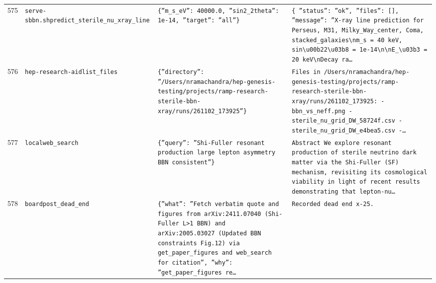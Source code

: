 \documentclass[11pt,a4paper]{article}
\begin{document}
\begin{longtable}{@{}p{}p{}p{}p{}@{}}
575 & \texttt{serve-sbbn.sh}\newline\texttt{predict\_\allowbreak{}sterile\_\allowbreak{}nu\_\allowbreak{}xray\_\allowbreak{}line} & \texttt{\{''m\_\allowbreak{}s\_\allowbreak{}eV'':\allowbreak{} 40000.0,\allowbreak{} ''sin2\_\allowbreak{}2theta'':\allowbreak{} 1e-14,\allowbreak{} ''target'':\allowbreak{} ''all''\}\allowbreak{}} & \texttt{\{   ''status'':\allowbreak{} ''ok'',\allowbreak{}   ''files'':\allowbreak{} []\allowbreak{},\allowbreak{}   ''message'':\allowbreak{} ''X-ray line prediction for Perseus,\allowbreak{} M31,\allowbreak{} Milky\_\allowbreak{}Way\_\allowbreak{}center,\allowbreak{} Coma,\allowbreak{} stacked\_\allowbreak{}galaxies\textbackslash{}\allowbreak{}nm\_\allowbreak{}s =\allowbreak{} 40 keV,\allowbreak{} sin\textbackslash{}\allowbreak{}u00b22\textbackslash{}\allowbreak{}u03b8 =\allowbreak{} 1e-14\textbackslash{}\allowbreak{}n\textbackslash{}\allowbreak{}nE\_\allowbreak{}\textbackslash{}\allowbreak{}u03b3 =\allowbreak{} 20 keV\textbackslash{}\allowbreak{}nDecay ra\ldots{}\allowbreak{}} \\
576 & \texttt{hep-research-aid}\newline\texttt{list\_\allowbreak{}files} & \texttt{\{''directory'':\allowbreak{} ''/\allowbreak{}Users/\allowbreak{}nramachandra/\allowbreak{}hep-genesis-testing/\allowbreak{}projects/\allowbreak{}ramp-research-sterile-bbn-xray/\allowbreak{}runs/\allowbreak{}261102\_\allowbreak{}173925''\}\allowbreak{}} & \texttt{Files in /\allowbreak{}Users/\allowbreak{}nramachandra/\allowbreak{}hep-genesis-testing/\allowbreak{}projects/\allowbreak{}ramp-research-sterile-bbn-xray/\allowbreak{}runs/\allowbreak{}261102\_\allowbreak{}173925:\allowbreak{}   - bbn\_\allowbreak{}vs\_\allowbreak{}neff.png   - sterile\_\allowbreak{}nu\_\allowbreak{}grid\_\allowbreak{}DW\_\allowbreak{}58724f.csv   - sterile\_\allowbreak{}nu\_\allowbreak{}grid\_\allowbreak{}DW\_\allowbreak{}e4bea5.csv   -\ldots{}\allowbreak{}} \\
577 & \texttt{local}\newline\texttt{web\_\allowbreak{}search} & \texttt{\{''query'':\allowbreak{} ''Shi-Fuller resonant production large lepton asymmetry BBN consistent''\}\allowbreak{}} & \texttt{Abstract We explore resonant production of sterile neutrino dark matter via the Shi-Fuller (SF)\allowbreak{} mechanism,\allowbreak{} revisiting its cosmological viability in light of recent results demonstrating that lepton-nu\ldots{}\allowbreak{}} \\
578 & \texttt{board}\newline\texttt{post\_\allowbreak{}dead\_\allowbreak{}end} & \texttt{\{''what'':\allowbreak{} ''Fetch verbatim quote and figures from arXiv:\allowbreak{}2411.07040 (Shi-Fuller L\textgreater{}\allowbreak{}1 BBN)\allowbreak{} and arXiv:\allowbreak{}2005.03027 (Updated BBN constraints Fig.12)\allowbreak{} via get\_\allowbreak{}paper\_\allowbreak{}figures and web\_\allowbreak{}search for citation'',\allowbreak{} ''why'':\allowbreak{} ''get\_\allowbreak{}paper\_\allowbreak{}figures re\ldots{}\allowbreak{}} & \texttt{Recorded dead end x-25.} \\

\end{longtable}
\end{document}
